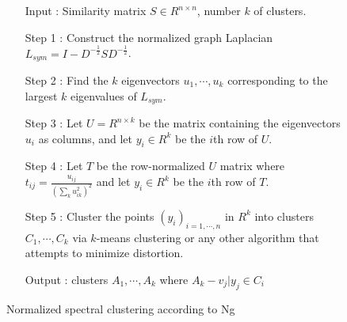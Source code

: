 \begin{figure}[ht]
\begin{mdframed}
\begin{enumerate}
\item[Input] : Similarity matrix $S \in R^{n \times n}$, number $k$ of clusters. \\
\item[Step 1] : Construct the normalized graph Laplacian $L_{sym} = I - D^{-\frac{1}{2}} S D^{-\frac{1}{2}}$. \\
\item[Step 2] : Find the $k$ eigenvectors $u_1, \cdots, u_k$ corresponding to the largest $k$ eigenvalues of $L_{sym}$. \\
\item[Step 3] : Let $U = R^{n \times k}$ be the matrix containing the eigenvectors $u_i$ as columns, and let $y_i \in R^k$ be the $i$th row of $U$.\\
\item[Step 4] : Let $T$ be the row-normalized $U$ matrix where $t_{ij} = \frac{u_{ij}}{(\sum_k u_{ik}^2)^2}$ and let $y_i \in R^k$ be the $i$th row of $T$.\\
\item[Step 5] : Cluster the points $(y_i)_{i=1,\cdots,n}$ in $R^k$ into clusters $C_1,\cdots,C_k$ via $k$-means clustering or any other algorithm that attempts to minimize distortion. \\
\item[Output] : clusters $A_1, \cdots, A_k$ where $A_k - {v_j|y_j \in C_i}$
\end{enumerate}
\end{mdframed}
\caption{Normalized spectral clustering according to Ng}
\end{figure}

